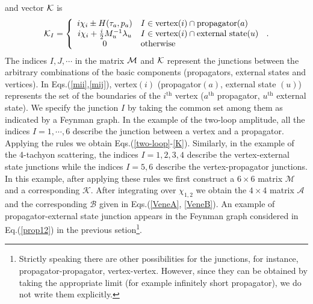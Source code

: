 \documentclass[a4paper,11pt]{article}
\begin{document}
and vector ${\cal K}$ is
\begin{eqnarray}
 {\cal K}_I=\left\{
\begin{array}[tb]{cl}
i\chi_i\pm H(\tau_a,p_a) &I\in\textrm{vertex}(i)
\cap\textrm{propagator}(a)\\
i\chi_i+{i\over 2}M_u^{-1}\lambda_u &I\in\textrm{vertex}(i)
\cap\textrm{external state}(u)\\
0 & \text{otherwise}
\end{array}
\right.\,.\label{ki}
\end{eqnarray}
The indices $I,J,\cdots$ in the matrix ${\cal M}$ and ${\cal K}$
represent the junctions between the arbitrary combinations of the
basic components (propagators, external states and vertices). In
Eqs.(\ref{mii},\ref{mij}), vertex$(i)$ (propagator$(a)$, external
state $(u)$) represents the set of the boundaries of the
$i^{\textrm{th}}$ vertex ($a^{\textrm{th}}$ propagator,
$u^{\textrm{th}}$ external state). We specify the junction $I$ by
taking the common set among them as indicated by a Feynman graph.
In the example of the two-loop amplitude, all the indices
$I=1,\cdots,6$ describe the junction between a vertex and a
propagator. Applying the rules we obtain
Eqs.(\ref{two-loop}-\ref{K}). Similarly, in the example of the
4-tachyon scattering, the indices $I=1,2,3,4$ describe the
vertex-external state junctions while the indices $I=5,6$ describe
the vertex-propagator junctions. In this example, after applying
these rules we first construct a $6\times6$ matrix $\mathcal{M}$
and a corresponding $\mathcal{K}$. After integrating over
$\chi_{1,2}$ we obtain the $4\times 4$ matrix $\mathcal{A}$ and
the corresponding $\mathcal{B}$ given in Eqs.(\ref{VeneA},
\ref{VeneB}).
An example of propagator-external state junction appears in the
Feynman graph considered in Eq.(\ref{prop12}) in the
previous setion\footnote{%
Strictly speaking there are other possibilities for
the junctions, for instance, propagator-propagator, vertex-vertex.
However, since they can be obtained by taking the appropriate
limit (for example infinitely short propagator), we do not write
them explicitly.}.
%
%
\end{document}
